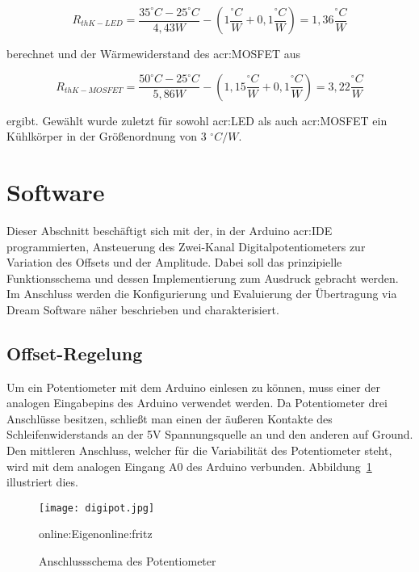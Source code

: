 \begin{equation}
	\label{equ:thermo2}
	R_{thK-LED} = \frac{35 ^\circ C - 25 ^\circ C}{4,43W}-(1 \frac{^\circ C}{W}+0,1 \frac{^\circ C}{W}) = 1,36\frac{^\circ C}{W}
\end{equation}

berechnet und der Wärmewiderstand des \gls{acr:MOSFET} aus
 
\begin{equation}
	\label{equ:thermo3}
	R_{thK-MOSFET} = \frac{50 ^\circ C - 25 ^\circ C}{5,86W}-(1,15 \frac{^\circ C}{W}+0,1 \frac{^\circ C}{W}) = 3,22\frac{^\circ C}{W}
\end{equation}

ergibt. Gewählt wurde zuletzt für sowohl \gls{acr:LED} als auch \gls{acr:MOSFET} ein Kühlkörper in der Größenordnung von 3 $^\circ C/W$.

\newpage
\section{Software}
\label{sec:Software}

Dieser Abschnitt beschäftigt sich mit der, in der Arduino \gls{acr:IDE} programmierten, Ansteuerung des Zwei-Kanal Digitalpotentiometers zur Variation des Offsets und der Amplitude. Dabei soll das prinzipielle Funktionsschema und dessen Implementierung zum Ausdruck gebracht werden. Im Anschluss werden die Konfigurierung und Evaluierung der Übertragung via Dream Software näher beschrieben und charakterisiert.

\subsection{Offset-Regelung}
\label{subsec:offset}
Um ein Potentiometer mit dem Arduino einlesen zu können, muss einer der analogen Eingabepins des Arduino verwendet werden. Da Potentiometer drei Anschlüsse besitzen, schließt man einen der äußeren Kontakte des Schleifenwiderstands an der 5V Spannungsquelle an und den anderen auf Ground. Den mittleren Anschluss, welcher für die Variabilität des Potentiometer steht, wird mit dem analogen Eingang A0 des Arduino verbunden. Abbildung~\ref{fig:digipot} illustriert dies. 

\begin{figure}[H]
	\centering
	\texttt{[image: digipot.jpg]}
	\caption[Anschlussschema des Potentiometer]{Anschlussschema des Potentiometer} 
	\gls{online:Eigen}\gls{online:fritz}
	\label{fig:digipot}
\end{figure}

